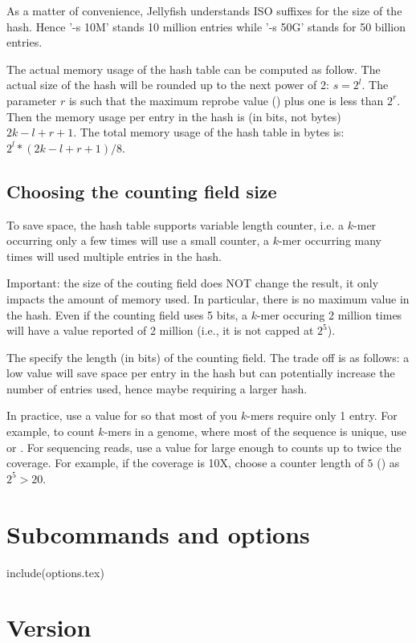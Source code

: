 \documentclass[english]{article}
\begin{document}
As a matter of convenience, Jellyfish understands ISO suffixes for the
size of the hash. Hence '-s 10M' stands 10 million entries while '-s
50G' stands for 50 billion entries.

The actual memory usage of the hash table can be computed as
follow. The actual size of the hash will be rounded up to the next
power of 2: $s=2^l$. The parameter $r$ is such that the maximum
reprobe value () plus one is less than $2^r$. Then the memory usage per
entry in the hash is (in bits, not bytes) $2k-l+r+1$. The total memory
usage of the hash table in bytes is: $2^l*(2k-l+r+1)/8$.

\subsection{Choosing the counting field size}
To save space, the hash table supports variable length counter, i.e. a
$k$-mer occurring only a few times will use a small counter, a $k$-mer
occurring many times will used multiple entries in the hash.

Important: the size of the couting field does NOT change the result,
it only impacts the amount of memory used. In particular, there is no
maximum value in the hash. Even if the counting field uses 5 bits, a
$k$-mer occuring 2 million times will have a value reported of 2
million (i.e., it is not capped at $2^5$).

The  specify the length (in bits) of the counting field. The
trade off is as follows: a low value will save space per entry in the
hash but can potentially increase the number of entries used, hence
maybe requiring a larger hash.

In practice, use a value for  so that most of you $k$-mers
require only 1 entry. For example, to count $k$-mers in a genome,
where most of the sequence is unique, use  or
. For sequencing reads, use a value for  large
enough to counts up to twice the coverage. For example, if the
coverage is 10X, choose a counter length of $5$ () as $2^5 > 20$.


\section{Subcommands and options}
include(options.tex)

\section{Version}
\end{document}
